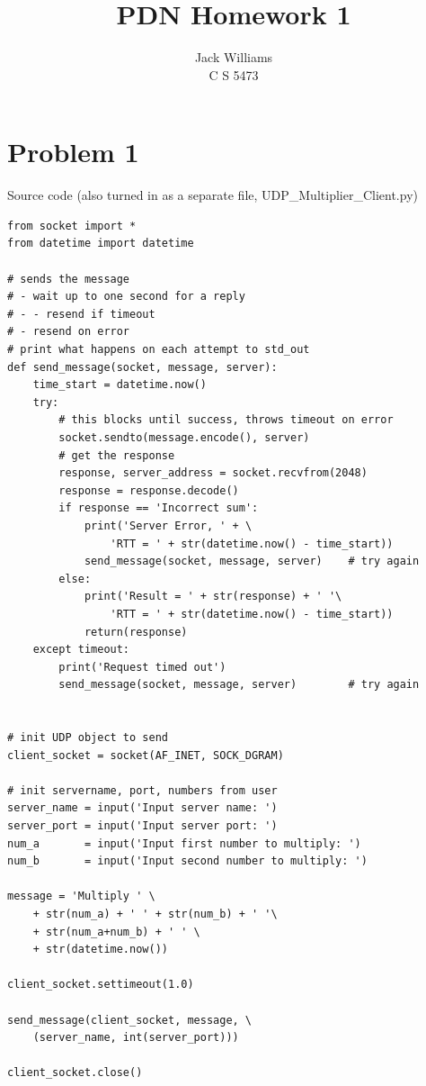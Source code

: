 \documentclass[12pt]{article}
\begin{document}
 
 
 
\title{PDN Homework 1}
\author{Jack Williams \\ C S 5473} %

\maketitle

\section*{Problem 1}

Source code (also turned in as a separate file, UDP\_Multiplier\_Client.py)

\begin{lstlisting}
from socket import *
from datetime import datetime

# sends the message
# - wait up to one second for a reply
# - - resend if timeout
# - resend on error
# print what happens on each attempt to std_out
def send_message(socket, message, server):
    time_start = datetime.now()
    try:
        # this blocks until success, throws timeout on error
        socket.sendto(message.encode(), server)
        # get the response
        response, server_address = socket.recvfrom(2048)
        response = response.decode()
        if response == 'Incorrect sum':
            print('Server Error, ' + \
                'RTT = ' + str(datetime.now() - time_start))
            send_message(socket, message, server)    # try again
        else:
            print('Result = ' + str(response) + ' '\
                'RTT = ' + str(datetime.now() - time_start))
            return(response)
    except timeout:
        print('Request timed out')
        send_message(socket, message, server)        # try again


# init UDP object to send
client_socket = socket(AF_INET, SOCK_DGRAM)

# init servername, port, numbers from user
server_name = input('Input server name: ')
server_port = input('Input server port: ')
num_a       = input('Input first number to multiply: ')
num_b       = input('Input second number to multiply: ')

message = 'Multiply ' \
    + str(num_a) + ' ' + str(num_b) + ' '\
    + str(num_a+num_b) + ' ' \
    + str(datetime.now())

client_socket.settimeout(1.0)

send_message(client_socket, message, \
	(server_name, int(server_port)))

client_socket.close()
\end{lstlisting}
\end{document}
